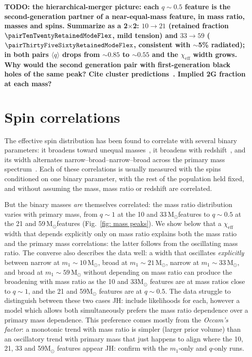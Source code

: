 \documentclass[%
 reprint,
 amsmath,amssymb,
 aps,
 prl,
 nofootinbib,nobibnotes,
]{revtex4-2}
\newcommand{\Msun}{\ensuremath{\mathrm{M}_{\odot}}}
\newcommand{\chieff}{\ensuremath{\chi_{\mathrm{eff}}}}
\newcommand{\todo}[1]{{\color{Blue}\bf TODO: #1}}
\newcommand{\jh}[1]{{\color{orange}JH: #1}}
\newcommand{\featTen}{10\xspace}
\newcommand{\featTwenty}{21\xspace}
\newcommand{\featThirtyFive}{33\xspace}
\newcommand{\featSixty}{59\xspace}
\begin{document}
\todo{the hierarchical-merger picture: each $q \sim 0.5$ feature is the second-generation partner of a near-equal-mass feature, in mass ratio, masses and spins. Summarize as a 2$\times$2: $\featTen \to \featTwenty$ (retained fraction $\pairTenTwentyRetainedModeFlex$, mild tension) and $\featThirtyFive \to \featSixty$ ($\pairThirtyFiveSixtyRetainedModeFlex$, consistent with $\sim$5\% radiated); in both pairs $\langle q \rangle$ drops from $\sim 0.85$ to $\sim 0.55$ and the $\chieff$ width grows. Why would the second generation pair with first-generation black holes of the same peak? Cite cluster predictions~\cite{Rodriguez:2019huv, Doctor:2019ruh, Kimball:2020opk, Gerosa:2021mno}. Implied 2G fraction at each mass?}

\section{Spin correlations}\label{sec: q-chi correlation}

The effective spin distribution has been found to correlate with several binary parameters: it broadens toward unequal masses~\cite{Callister:2021fpo, Adamcewicz:2022hce, Heinzel:2023hlb, LIGOScientific:2026ctl}, it broadens with redshift~\cite{Biscoveanu:2022qac, Heinzel:2023hlb}, and its width alternates narrow--broad--narrow--broad across the primary mass spectrum~\cite{Plunkett:2026pxt, Antonini:2025ilj, Tong:2025xir, Alvarez-Lopez:2026ymo}. Each of these correlations is usually measured with the spins conditioned on one binary parameter, with the rest of the population held fixed, and without assuming the mass, mass ratio or redshift are correlated. 


But the binary masses \textit{are} themselves correlated: the mass ratio distribution varies with primary mass, from $q \sim 1$ at the \featTen and \featThirtyFive\,\Msun features to $q \sim 0.5$ at the \featTwenty and \featSixty\,\Msun features (Fig.~\ref{fig: mass peaks}). We show below that a $\chieff$ width that depends explicitly only on mass ratio explains both the mass ratio and the primary mass correlations: the latter follows from the oscillating mass ratio. The converse also describes the data well: a width that oscillates \textit{explicitly} between narrow at $m_1\sim \featTen\,\Msun$, broad at $m_1\sim \featTwenty\,\Msun$, narrow at $m_1\sim \featThirtyFive\,\Msun$, and broad at $m_1\sim \featSixty\,\Msun$ without depending on mass ratio can produce the broadening with mass ratio as the \featTen and \featThirtyFive $\Msun$ features are at mass ratios close to $q\sim1$, and the \featTwenty and \featSixty $\Msun$ features are at $q\sim 0.5$. 
The data struggle to distinguish between these two cases \jh{include likelihoods for each}, however a model which allows both simultaneously prefers the mass ratio dependence over a primary mass dependence. This preference comes mostly from the \textit{Occam's factor}: a monotonic trend with mass ratio is simpler (larger prior volume) than an oscillatory trend with primary mass that just happens to align where the \featTen, \featTwenty, \featThirtyFive and \featSixty $\Msun$ features appear \jh{confirm with the $m_1$-only and $q$-only runs}. 
\end{document}
